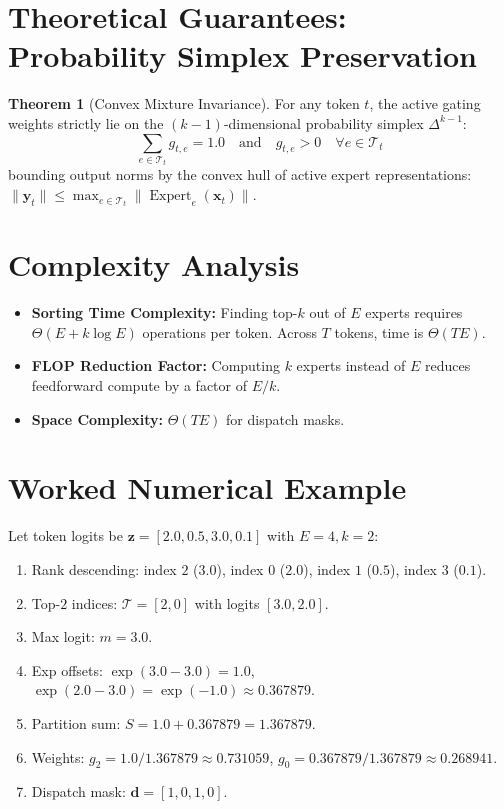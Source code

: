 \documentclass[11pt,a4paper]{article}
\theoremstyle{definition}
\newtheorem{theorem}{Theorem}[section]
\begin{document}
\section{Theoretical Guarantees: Probability Simplex Preservation}

\begin{theorem}[Convex Mixture Invariance]
For any token $t$, the active gating weights strictly lie on the $(k-1)$-dimensional probability simplex $\Delta^{k-1}$:
\begin{equation}
\sum_{e \in \mathcal{T}_t} g_{t, e} = 1.0 \quad \text{and} \quad g_{t, e} > 0 \quad \forall e \in \mathcal{T}_t
\end{equation}
bounding output norms by the convex hull of active expert representations: $\|\mathbf{y}_t\| \le \max_{e \in \mathcal{T}_t} \|\operatorname{Expert}_e(\mathbf{x}_t)\|$.
\end{theorem}

\section{Complexity Analysis}
\begin{itemize}
    \item \textbf{Sorting Time Complexity:} Finding top-$k$ out of $E$ experts requires $\Theta(E + k \log E)$ operations per token. Across $T$ tokens, time is $\Theta(T E)$.
    \item \textbf{FLOP Reduction Factor:} Computing $k$ experts instead of $E$ reduces feedforward compute by a factor of $E / k$.
    \item \textbf{Space Complexity:} $\Theta(T E)$ for dispatch masks.
\end{itemize}

\section{Worked Numerical Example}
Let token logits be $\mathbf{z} = [2.0, 0.5, 3.0, 0.1]$ with $E = 4, k = 2$:
\begin{enumerate}
    \item Rank descending: index $2$ ($3.0$), index $0$ ($2.0$), index $1$ ($0.5$), index $3$ ($0.1$).
    \item Top-$2$ indices: $\mathcal{T} = [2, 0]$ with logits $[3.0, 2.0]$.
    \item Max logit: $m = 3.0$.
    \item Exp offsets: $\exp(3.0 - 3.0) = 1.0$, $\exp(2.0 - 3.0) = \exp(-1.0) \approx 0.367879$.
    \item Partition sum: $S = 1.0 + 0.367879 = 1.367879$.
    \item Weights: $g_2 = 1.0 / 1.367879 \approx 0.731059$, $g_0 = 0.367879 / 1.367879 \approx 0.268941$.
    \item Dispatch mask: $\mathbf{d} = [1, 0, 1, 0]$.
\end{enumerate}
\end{document}
